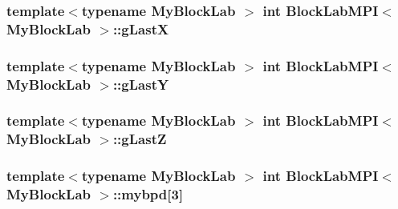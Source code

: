 \subsubsection[{g\+Last\+X}]{\setlength{\rightskip}{0pt plus 5cm}template$<$typename My\+Block\+Lab $>$ int {\bf Block\+Lab\+M\+P\+I}$<$ My\+Block\+Lab $>$\+::g\+Last\+X\hspace{0.3cm}{\ttfamily [protected]}}\label{class_block_lab_m_p_i_a41646b94f197315e4c39c5155ee939eb}
\hypertarget{class_block_lab_m_p_i_afc336a0d08b78a9196eb24701816d6c8}{}
\subsubsection[{g\+Last\+Y}]{\setlength{\rightskip}{0pt plus 5cm}template$<$typename My\+Block\+Lab $>$ int {\bf Block\+Lab\+M\+P\+I}$<$ My\+Block\+Lab $>$\+::g\+Last\+Y\hspace{0.3cm}{\ttfamily [protected]}}\label{class_block_lab_m_p_i_afc336a0d08b78a9196eb24701816d6c8}
\hypertarget{class_block_lab_m_p_i_a8b9247a3ec2caad18896f597b98b7103}{}
\subsubsection[{g\+Last\+Z}]{\setlength{\rightskip}{0pt plus 5cm}template$<$typename My\+Block\+Lab $>$ int {\bf Block\+Lab\+M\+P\+I}$<$ My\+Block\+Lab $>$\+::g\+Last\+Z\hspace{0.3cm}{\ttfamily [protected]}}\label{class_block_lab_m_p_i_a8b9247a3ec2caad18896f597b98b7103}
\hypertarget{class_block_lab_m_p_i_a11a592341f9c28f07809f0d950512fe5}{}
\subsubsection[{mybpd}]{\setlength{\rightskip}{0pt plus 5cm}template$<$typename My\+Block\+Lab $>$ int {\bf Block\+Lab\+M\+P\+I}$<$ My\+Block\+Lab $>$\+::mybpd\mbox{[}3\mbox{]}\hspace{0.3cm}{\ttfamily [protected]}}\label{class_block_lab_m_p_i_a11a592341f9c28f07809f0d950512fe5}
\hypertarget{class_block_lab_m_p_i_a346371e08c48393a09a60188aa210828}{}

